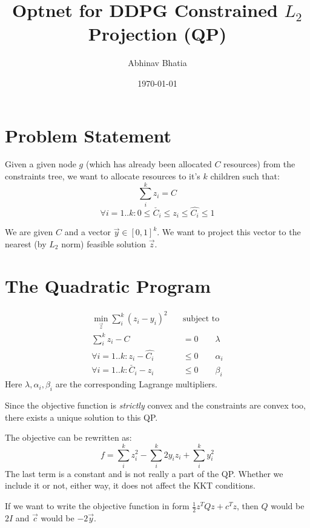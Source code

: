 \documentclass[11 pt]{article}
\begin{document}
\title{Optnet for DDPG Constrained $L_2$ Projection (QP)}
\author{Abhinav Bhatia}
\date{\today}
\maketitle


\section{Problem Statement}

Given a given node $g$ (which has already been allocated $C$ resources) from the constraints tree, we want to allocate resources to it's $k$ children such that:
\[\sum_i^k z_i = C \]
\[\forall i=1..k : 0 \le \check{C_i} \le z_i \le \hat{C_i} \le 1\]

We are given $C$ and a vector $\vec{y} \in [0, 1]^k$. We want to project this vector to the nearest (by $L_2$ norm) feasible solution $\vec{z}$.


\section{The Quadratic Program}

\begin{equation} \label{qp}
    \begin{aligned}
        \underset{\vec{z}}{\min} \sum_i^k (z_i - y_i)^2 \quad &\text{subject to} \\
        \sum_i^k z_i - C &= 0                   \qquad \lambda\\
        \forall i=1..k : z_i - \hat{C_i} &\le 0      \qquad \alpha_i\\
        \forall i=1..k : \check{C_i} - z_i &\le 0    \qquad \beta_i
    \end{aligned}
\end{equation}
Here $\lambda,\alpha_i,\beta_i$ are the corresponding Lagrange multipliers.

Since the objective function is \textit{strictly} convex and the constraints are convex too, there exists a unique solution to this QP.

The objective can be rewritten as:
\[f = \sum_i^k z_i^2 - \sum_i^k 2 y_i z_i + \sum_i^k y_i^2\]
The last term is a constant and is not really a part of the QP. Whether we include it or not, either way, it does not affect the KKT conditions.

If we want to write the objective function in form $\frac{1}{2}z^T Q z + c^Tz$, then $Q$ would be $2I$ and $\vec{c}$ would be $-2\vec{y}$.
\end{document}
